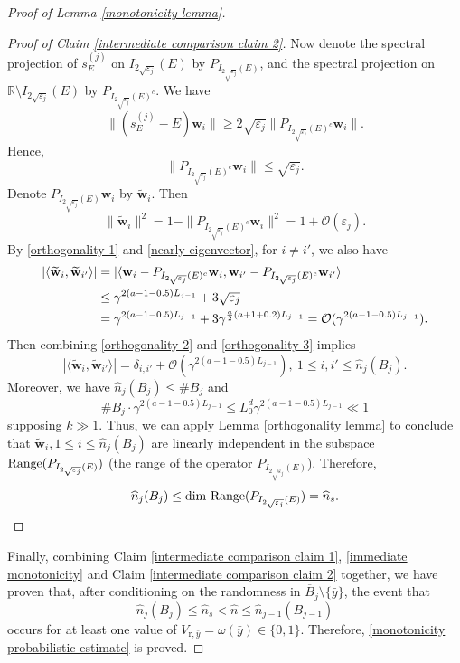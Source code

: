 \documentclass[11pt,reqno,UTF8,twoside]{amsart}
\newcommand{\R}{\mathbb{R}}
\newcommand{\bfw}{\mathbf{w}}
\newcommand{\mcO}{\mathcal{O}}
\newcommand{\whn}{\widehat{n}}
\newcommand{\barB}{\overline{B}}
\newcommand{\smallSj}{s^{(j)}}
\theoremstyle{definition}
\numberwithin{equation}{section}
\begin{document}
\begin{proof}[Proof of Lemma \ref{monotonicity lemma}]
\begin{proof}[Proof of  Claim \ref{intermediate comparison claim 2}]
  Now denote the spectral projection of $\smallSj_E$ on $I_{2\sqrt{\varepsilon_j}}(E)$ by $P_{I_{2\sqrt{\varepsilon_j}}(E)}$, and the spectral projection on $\R\setminus I_{2\sqrt{\varepsilon_j}}(E)$ by $P_{I_{2\sqrt{\varepsilon_j}}(E)^c}$. We have 
  \[\| (\smallSj_E-E) \bfw_i \| \geq 2 \sqrt{\varepsilon_j} \| P_{I_{2\sqrt{\varepsilon_j}}(E)^c} \bfw_i\|. \]
  Hence, 
  \begin{equation}\label{nearly eigenvector}
    \| P_{I_{2\sqrt{\varepsilon_j}}(E)^c} \bfw_i\|\leq \sqrt{\varepsilon_j}.
  \end{equation}
  Denote $P_{I_{2\sqrt{\varepsilon_j}}(E)}\bfw_i$ by $\widetilde{\bfw}_i$. Then 
  \begin{equation}\label{orthogonality 2}
    \|\widetilde{\bfw}_i \|^2 =1-\| P_{I_{2\sqrt{\varepsilon_j}}(E)^c} \bfw_i\|^2=1+\mcO(\varepsilon_j).
  \end{equation}
  By \eqref{orthogonality 1} and \eqref{nearly eigenvector}, for $i\neq i'$,  we also have 
  \begin{align}\label{orthogonality 3}
    |\langle \widetilde{\bfw}_{i},\widetilde{\bfw}_{i'}\rangle| & = |\langle \bfw_i-P_{I_{2\sqrt{\varepsilon_j}}(E)^c}\bfw_i,\bfw_{i'}-P_{I_{2\sqrt{\varepsilon_j}}(E)^c}\bfw_{i'}\rangle| \\
    \notag      &\leq  \gamma^{2(a-1-0.5)L_{j-1}} + 3 \sqrt{\varepsilon_j} \\
    \notag    &=  \gamma^{2(a-1-0.5)L_{j-1}} + 3 \gamma^{\frac{a}{2}(a+1+0.2)L_{j-1}} =\mcO( \gamma^{2(a-1-0.5)L_{j-1}}).
  \end{align}
Then  combining   \eqref{orthogonality 2} and \eqref{orthogonality 3}  implies  
  \begin{equation}
    |\langle \widetilde{\bfw}_{i},\widetilde{\bfw}_{i'}\rangle| =\delta_{i,i'} +\mcO(\gamma^{2(a-1-0.5)L_{j-1}}), \ 1\leq i,i'\leq \whn_j(B_j). 
  \end{equation}
   Moreover,  we have  $ \whn_{j}(B_j)\leq \# B_j $ and 
  \[ \# B_j \cdot \gamma^{2(a-1-0.5)L_{j-1}}\leq L_0^d \gamma^{2(a-1-0.5)L_{j-1}} \ll 1 \]
  supposing $k\gg1$. Thus, we can apply Lemma \ref{orthogonality lemma} to conclude that $\widetilde{\bfw}_i,1\leq i\leq \whn_j(B_j)$ are linearly independent in the subspace ${\rm Range}(P_{I_{2\sqrt{\varepsilon_j}}(E)} )$ (the range of  the operator $P_{I_{2\sqrt{\varepsilon_j}}(E)}$). Therefore,
  \[ \whn_j(B_j)\leq  {\rm dim} \ {\rm Range} (P_{I_{2\sqrt{\varepsilon_j}}(E)})= \whn_s.\]


\end{proof}

Finally, combining  Claim \ref{intermediate comparison claim 1}, \eqref{immediate monotonicity} and Claim \ref{intermediate comparison claim 2} together, we have proven  that, after conditioning on the randomness in $\barB_{j}\setminus \{\bar{y}\}$, the event that 
\[\whn_j(B_j)\leq \whn_s< \whn\leq \whn_{j-1}(B_{j-1})\]
occurs  for at least one value of $V_{\text{r},\bar{y}}=\omega(\bar{y})\in \{0,1\}$. Therefore, \eqref{monotonicity probabilistic estimate} is proved.

\end{proof}
\end{document}
